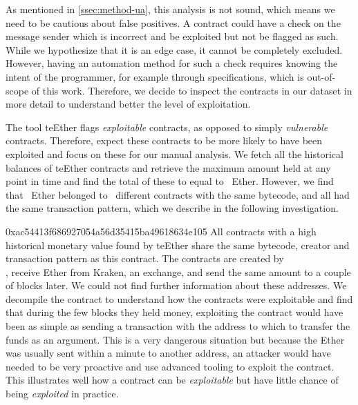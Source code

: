  As mentioned in \autoref{ssec:method-ua}, this analysis is not sound, which means we need to be cautious about false positives.
A contract could have a check on the message sender which is incorrect and be exploited but not be flagged as such.
While we hypothesize that it is an edge case, it cannot be completely excluded.
However, having an automation method for such a check requires knowing the intent of the programmer, for example through specifications, which is out-of-scope of this work.
Therefore, we decide to inspect the contracts in our dataset in more detail to understand better the level of exploitation.

The tool teEther flags \emph{exploitable} contracts, as opposed to simply \emph{vulnerable} contracts.
Therefore, expect these contracts to be more likely to have been exploited and focus on these for our manual analysis.
We fetch all the historical balances of teEther contracts and retrieve the maximum amount held at any point in time and find the total of these to equal to~ Ether.
However, we find that~ Ether belonged to~ different contracts with the same bytecode, and all had the same transaction pattern, which we describe in the following investigation.

\begin{investigation}{0xac54413f686927054a56d35415ba49618634e105}
	All contracts with a high historical monetary value found by teEther share the same bytecode, creator and transaction pattern as this contract.
	The contracts are created by\\ , receive Ether from Kraken, an exchange, and send the same amount to  a couple of blocks later.
	We could not find further information about these addresses.
	We decompile the contract to understand how the contracts were exploitable and find that during the few blocks they held money, exploiting the contract would have been as simple as sending a transaction with the address to which to transfer the funds as an argument.
	This is a very dangerous situation but because the Ether was usually sent within a minute to another address, an attacker would have needed to be very proactive and use advanced tooling to exploit the contract.
	This illustrates well how a contract can be \emph{exploitable} but have little chance of being \emph{exploited} in practice.
\end{investigation}

